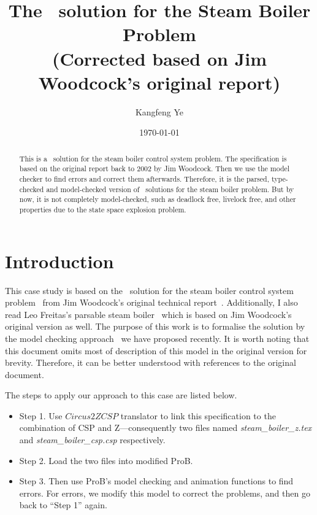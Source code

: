\documentclass{report} %
\begin{document}


\title{The \Circus\ solution for the Steam Boiler Problem \\ (Corrected based on Jim Woodcock's original report)}
\author{Kangfeng Ye}
\date{\today}

\maketitle

\begin{abstract}
   \noindent This is a \Circus\ solution for the steam boiler control system problem. The specification is based on the original report back to 2002 by Jim Woodcock. Then we use the model checker to find errors and correct them afterwards. Therefore, it is the parsed, type-checked and model-checked version of \Circus\ solutions for the steam boiler problem. But by now, it is not completely model-checked, such as deadlock free, livelock free, and other properties due to the state space explosion problem.
\end{abstract}


\newpage %

\tableofcontents %

\newpage %

\chapter{Introduction}

This case study is based on the \Circus\ solution for the steam boiler control system problem~\cite{Abrial1995} from Jim Woodcock's original technical report~\cite{Woodcock2001a}. Additionally, I also read Leo Freitas's parsable steam boiler~\cite{Freitas2006} which is based on Jim Woodcock's original version as well. The purpose of this work is to formalise the solution by the model checking approach~\cite{Ye2015} we have proposed recently. It is worth noting that this document omits most of description of this model in the original version for brevity. Therefore, it can be better understood with references to the original document. 

The steps to apply our approach to this case are listed below. 
\begin{itemize}
    \item Step 1. Use $Circus2ZCSP$ translator to link this specification to the combination of CSP and Z---consequently two files named \emph{steam\_boiler\_z.tex} and \emph{steam\_boiler\_csp.csp} respectively.
    \item Step 2. Load the two files into modified ProB. 
    \item Step 3. Then use ProB's model checking and animation functions to find errors. For errors, we modify this model to correct the problems, and then go back to ``Step 1'' again.
\end{itemize}
\end{document}
